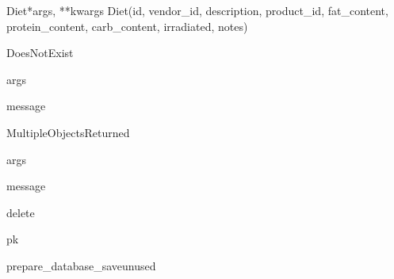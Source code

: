 \documentclass[letterpaper,10pt,english]{sphinxmanual}
\begin{document}
\hypertarget{data.models.Diet}{}\begin{classdesc}{Diet}{*args, **kwargs}
Diet(id, vendor\_id, description, product\_id, fat\_content, protein\_content, carb\_content, irradiated, notes)

\hypertarget{data.models.Diet.DoesNotExist}{}\begin{excdesc}{DoesNotExist}~

\hypertarget{data.models.Diet.DoesNotExist.args}{}\begin{memberdesc}{args}\end{memberdesc}

\hypertarget{data.models.Diet.DoesNotExist.message}{}\begin{memberdesc}{message}\end{memberdesc}
\end{excdesc}

\hypertarget{data.models.Diet.MultipleObjectsReturned}{}\begin{excdesc}{MultipleObjectsReturned}~

\hypertarget{data.models.Diet.MultipleObjectsReturned.args}{}\begin{memberdesc}{args}\end{memberdesc}

\hypertarget{data.models.Diet.MultipleObjectsReturned.message}{}\begin{memberdesc}{message}\end{memberdesc}
\end{excdesc}

\hypertarget{data.models.Diet.delete}{}\begin{methoddesc}[Diet]{delete}{}\end{methoddesc}

\hypertarget{data.models.Diet.pk}{}\begin{memberdesc}[Diet]{pk}\end{memberdesc}

\hypertarget{data.models.Diet.prepare_database_save}{}\begin{methoddesc}[Diet]{prepare\_database\_save}{unused}\end{methoddesc}


\end{classdesc}
\end{document}
